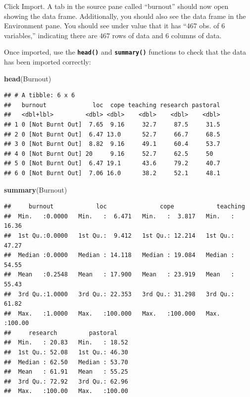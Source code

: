 \documentclass[
]{book}
\newenvironment{Shaded}{\begin{snugshade}}{\end{snugshade}}
\newcommand{\FunctionTok}[1]{\textcolor[rgb]{0.13,0.29,0.53}{\textbf{#1}}}
\newcommand{\NormalTok}[1]{#1}
\begin{document}
Click Import. A tab in the source pane called ``burnout'' should now open showing the data frame. Additionally, you should also see the data frame in the Environment pane. You should see under value that it has ``467 obs. of 6 variables,'' indicating there are 467 rows of data and 6 columns of data.

Once imported, use the \textbf{\texttt{head()}} and \textbf{\texttt{summary()}} functions to check that the data has been imported correctly:

\begin{Shaded}
\begin{Highlighting}[]
\FunctionTok{head}\NormalTok{(Burnout)}
\end{Highlighting}
\end{Shaded}

\begin{verbatim}
## # A tibble: 6 x 6
##   burnout             loc  cope teaching research pastoral
##   <dbl+lbl>         <dbl> <dbl>    <dbl>    <dbl>    <dbl>
## 1 0 [Not Burnt Out]  7.65  9.16     32.7     87.5     31.5
## 2 0 [Not Burnt Out]  6.47 13.0      52.7     66.7     68.5
## 3 0 [Not Burnt Out]  8.82  9.16     49.1     60.4     53.7
## 4 0 [Not Burnt Out] 20     9.16     52.7     62.5     50  
## 5 0 [Not Burnt Out]  6.47 19.1      43.6     79.2     40.7
## 6 0 [Not Burnt Out]  7.06 16.0      38.2     52.1     48.1
\end{verbatim}

\begin{Shaded}
\begin{Highlighting}[]
\FunctionTok{summary}\NormalTok{(Burnout)}
\end{Highlighting}
\end{Shaded}

\begin{verbatim}
##     burnout            loc               cope            teaching     
##  Min.   :0.0000   Min.   :  6.471   Min.   :  3.817   Min.   : 16.36  
##  1st Qu.:0.0000   1st Qu.:  9.412   1st Qu.: 12.214   1st Qu.: 47.27  
##  Median :0.0000   Median : 14.118   Median : 19.084   Median : 54.55  
##  Mean   :0.2548   Mean   : 17.900   Mean   : 23.919   Mean   : 55.43  
##  3rd Qu.:1.0000   3rd Qu.: 22.353   3rd Qu.: 31.298   3rd Qu.: 61.82  
##  Max.   :1.0000   Max.   :100.000   Max.   :100.000   Max.   :100.00  
##     research         pastoral     
##  Min.   : 20.83   Min.   : 18.52  
##  1st Qu.: 52.08   1st Qu.: 46.30  
##  Median : 62.50   Median : 53.70  
##  Mean   : 61.91   Mean   : 55.25  
##  3rd Qu.: 72.92   3rd Qu.: 62.96  
##  Max.   :100.00   Max.   :100.00
\end{verbatim}
\end{document}
